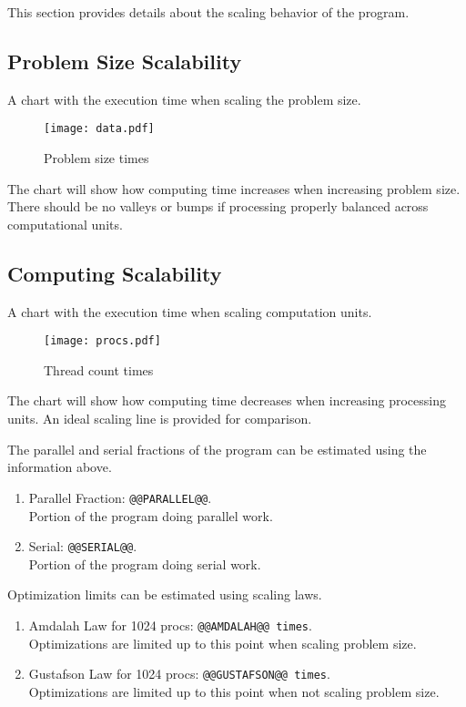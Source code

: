 \documentclass[a4paper]{article}
\begin{document}
This section provides details about the scaling behavior of the program.

\subsection{Problem Size Scalability}

A chart with the execution time when scaling the problem size.

\begin{figure}[H]
\label{fig:scaling}
\centering
\texttt{[image: data.pdf]}
\caption{Problem size times}
\end{figure}

The chart will show how computing time increases when increasing problem size.
There should be no valleys or bumps if processing properly balanced across computational units.

\subsection{Computing Scalability}

A chart with the execution time when scaling computation units.

\begin{figure}[H]
\label{fig:threads}
\centering
\texttt{[image: procs.pdf]}
\caption{Thread count times}
\end{figure}

The chart will show how computing time decreases when increasing processing units.
An ideal scaling line is provided for comparison.

The parallel and serial fractions of the program can be estimated using the information above.

\begin{enumerate}
\item Parallel Fraction: {\tt @@PARALLEL@@}.\\Portion of the program doing parallel work.
\item Serial: {\tt @@SERIAL@@}.\\Portion of the program doing serial work.
\end{enumerate}

Optimization limits can be estimated using scaling laws.

\begin{enumerate}
\item Amdalah Law for 1024 procs: {\tt @@AMDALAH@@ times}.\\ Optimizations are limited up to this point when scaling problem size. \cite{amdalah}
\item Gustafson Law for 1024 procs: {\tt @@GUSTAFSON@@ times}.\\ Optimizations are limited up to this point when not scaling problem size. \cite{gustafson}
\end{enumerate}
\end{document}
